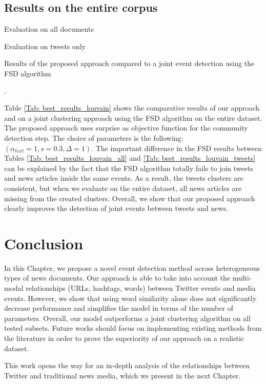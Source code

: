 \subsection{Results on the entire corpus}
\label{Joint_results}
\begin{table}[h]
\centering
\begin{subtable}{.5\textwidth}
  \centering
  
  \caption{Evaluation on all documents}
  \label{Tab: best_results_louvain_all}
\end{subtable}%
\begin{subtable}{.5\textwidth}
  \centering
  
  \caption{Evaluation on tweets only}
  \label{Tab: best_results_louvain_tweets}
\end{subtable}
\caption{Results of the proposed approach compared to a joint event detection using the FSD algorithm}.
\label{Tab: best_results_louvain}
\end{table}
Table \ref{Tab: best_results_louvain} shows the comparative results of our approach and on a joint clustering approach using the FSD algorithm on the entire dataset. The proposed approach uses surprise as objective function for the community detection step. The choice of parameters is the following: $(\alpha_{text}=1, s=0.3, \Delta=1)$. The important difference in the FSD results between Tables \ref{Tab: best_results_louvain_all} and \ref{Tab: best_results_louvain_tweets} can be explained by the fact that the FSD algorithm totally fails to join tweets and news articles inside the same events. As a result, the tweets clusters are consistent, but when we evaluate on the entire dataset, all news articles are missing from the created clusters. Overall, we show that our proposed approach clearly improves the detection of joint events between tweets and news.


\section{Conclusion}
In this Chapter, we propose a novel event detection method across heterogeneous types of news documents. Our approach is able to take into account the multi-modal relationships (URLs, hashtags, words) between Twitter events and media events. However, we show that using word similarity alone does not significantly decrease performance and simplifies the model in terms of the number of parameters. Overall, our model outperforms a joint clustering algorithm on all tested subsets. Future works should focus on implementing existing methods from the literature \citep{mele_linking_2017, hua_topical_2016} in order to prove the superiority of our approach on a realistic dataset.

This work opens the way for an in-depth analysis of the relationships between Twitter and traditional news media, which we present in the next Chapter.